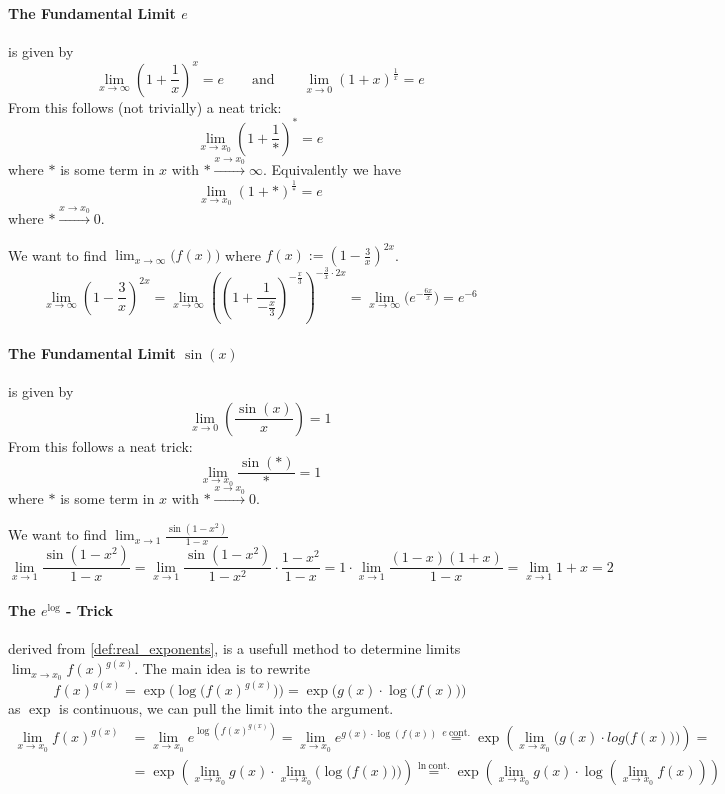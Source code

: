 \paragraph{The Fundamental Limit \(e\)} is given by
\[\lim_{x \to \infty} \left(1 + \frac{1}{x}\right)^x = e \qquad\text{and}\qquad \lim_{x \to 0} (1 + x)^{\frac{1}{x}} = e\]
From this follows (not trivially) a neat trick:
\[\lim_{x \to x_0} \left(1 + \frac{1}{\ast}\right)^* = e\]
where \(\ast\) is some term in \(x\) with \(\ast \xrightarrow{x \to x_0} \infty\).
Equivalently we have
\[\lim_{x \to x_0} (1 + \ast)^{\frac{1}{\ast}} = e\]
where \(\ast \xrightarrow{x \to x_0} 0\).
\begin{example}
   We want to find \(\lim_{x \to \infty}\big(f(x)\big)\) where \(f(x) := \left(1 - \frac{3}{x}\right)^{2x}\).
   \[\lim_{x \to \infty} \left(1 - \frac{3}{x}\right)^{2x} = \lim_{x \to \infty} \left(\left(1 + \frac{1}{-\frac{x}{3}}\right)^{-\frac{x}{3}}\right)^{-\frac{3}{x} \cdot 2x} = \lim_{x \to \infty}\Big(e^{-\frac{6x}{x}}\Big) = e^{-6}\]
\end{example}

\paragraph{The Fundamental Limit \(\sin(x)\)} is given by
\[\lim_{x \to 0}\left(\frac{\sin(x)}{x}\right) = 1\]
From this follows a neat trick:
\[\lim_{x \to x_0} \frac{\sin(\ast)}{\ast} = 1\]
where \(\ast\) is some term in \(x\) with \(\ast \xrightarrow{x \to x_0} 0\).
\begin{example}
   We want to find \(\lim_{x \to 1} \frac{\sin(1-x^2)}{1-x}\)
   \[\lim_{x \to 1} \frac{\sin(1-x^2)}{1-x} = \lim_{x \to 1}\frac{\sin(1-x^2)}{1-x^2} \cdot \frac{1-x^2}{1-x} = 1 \cdot \lim_{x \to 1} \frac{(1-x)(1+x)}{1-x} = \lim_{x \to 1} 1 + x = 2\]
\end{example}

\paragraph{The \(e^{\log}\) - Trick} derived from \cref{def:real_exponents}, is a usefull method to determine limits \(\lim_{x \to x_0} f(x)^{g(x)}\).
The main idea is to rewrite
\[f(x)^{g(x)} = \exp\Big(\log\big(f(x)^{g(x)}\big)\Big) = \exp\Big(g(x) \cdot \log\big(f(x)\big)\Big)\]
as \(\exp\) is continuous, we can pull the limit into the argument.
\begin{equation*}
   \begin{split}
      \lim_{x \to x_0} f(x)^{g(x)} &= \lim_{x \to x_0} e^{\log(f(x)^{g(x)})} = \lim_{x \to x_0} e^{g(x) \cdot \log(f(x))} \overset{e~\text{cont.}}{=} \exp\left(\lim_{x \to x_0} \Big(g(x) \cdot log\big(f(x)\big)\Big)\right) = \\
                                   & = \exp\left(\lim_{x \to x_0}g(x) \cdot \lim_{x \to x_0}\Big(\log\big(f(x)\big)\Big)\right) \overset{\ln~\text{cont.}}{=} \exp\left(\lim_{x \to x_0}g(x) \cdot \log\left(\lim_{x \to x_0}f(x)\right)\right)
   \end{split}
\end{equation*}
\begin{example}
\end{example}

